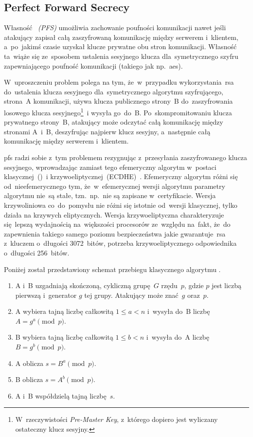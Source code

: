 \documentclass[thesis]{subfiles}
\begin{document}

\subsection{Perfect Forward Secrecy}
\label{sec:pfs}

Własność \emph{~(PFS)} umożliwia zachowanie poufności komunikacji nawet jeśli atakujący zapisał całą zaszyfrowaną komunikację między serwerem i~klientem, a~po~jakimś czasie uzyskał klucze prywatne obu stron komunikacji. Własność ta~wiąże się ze~sposobem ustalenia sesyjnego klucza dla~symetrycznego szyfru zapewniającego poufność komunikacji (takiego jak np.~\gls{aes}).

W~uproszczeniu problem polega na tym, że~w~przypadku wykorzystania~\gls{rsa} do~ustalenia klucza sesyjnego dla~symetrycznego algorytmu szyfrującego, strona~A komunikacji, używa klucza publicznego strony~B do~zaszyfrowania losowego klucza sesyjnego\footnote{W~rzeczywistości \emph{Pre-Master Key}, z~którego dopiero jest wyliczany ostateczny klucz sesyjny.}~i wysyła go~do~B. Po~skompromitowaniu klucza prywatnego strony~B, atakujący może odczytać całą komunikację między stronami A~i~B, deszyfrując najpierw klucz sesyjny, a~następnie całą komunikację między serwerem i~klientem.

\gls{pfs} radzi sobie z~tym problemem rezygnując z~przesyłania zaszyfrowanego klucza sesyjnego, wprowadzając zamiast tego efemeryczny algorytm  w~postaci klasycznej~()~i krzywoeliptycznej~(ECDHE)~\cite{mimuw-ssl-w04,openssl-cookbook-suites}. Efemeryczny algorytm  różni się od~nieefemerycznego tym, że~w~efemerycznej wersji algorytmu parametry algorytmu nie~są stałe, tzn.~np.~nie są zapisane w~certyfikacie. Wersja krzywoliniowa co~do~pomysłu nie różni się istotnie od~wersji klasycznej, tylko działa na krzywych eliptycznych. Wersja krzywoeliptyczna charakteryzuje się~lepszą wydajnością na~większości procesorów ze~względu na~fakt, że~do zapewnienia takiego samego poziomu bezpieczeństwa jakie gwarantuje~\gls{rsa} z~kluczem o~długości 3072~bitów, potrzeba krzywoeliptycznego odpowiednika o~długości 256~bitów.

Poniżej został przedstawiony schemat przebiegu klasycznego algorytmu .

\begin{enumerate}
\item A i~B uzgadniają skończoną, cykliczną grupę~$G$ rzędu~$p$, gdzie $p$ jest liczbą pierwszą i~generator $g$ tej grupy. Atakujący może znać~$g$ oraz~$p$.
\item A wybiera tajną liczbę całkowitą $1 \leq a < n$ i~wysyła do~B liczbę $A=g^a \pmod{p}$.
\item B wybiera tajną liczbę całkowitą $1 \leq b < n$ i~wysyła do~A liczbę $B=g^b \pmod{p}$.
\item A oblicza $s=B^a \pmod{p}$.
\item B oblicza $s=A^b \pmod{p}$.
\item A i~B współdzielą tajną liczbę~$s$.
\end{enumerate}
\end{document}
